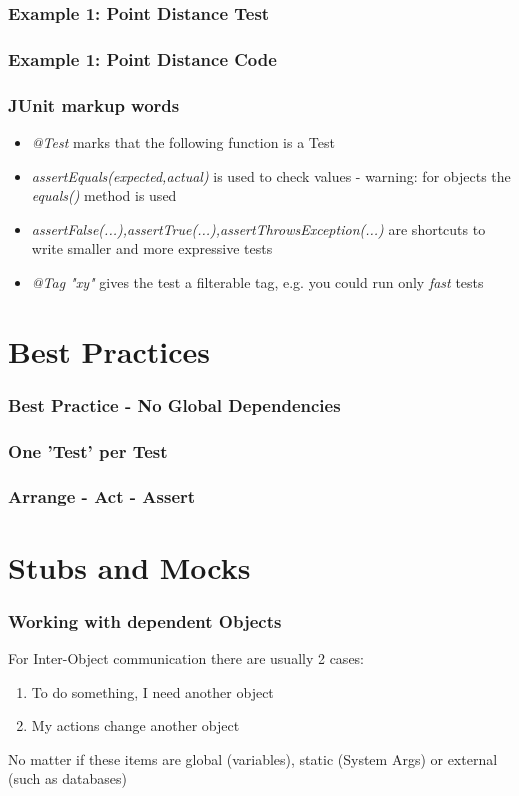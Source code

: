 \documentclass[12pt]{beamer}
\begin{document}
	\begin{frame}
		\frametitle{Example 1: Point Distance Test}
	\end{frame}
	
	\begin{frame}
		\frametitle{Example 1: Point Distance Code}
	\end{frame}
	
	\begin{frame}
		\frametitle{JUnit markup words}
		\begin{itemize}
			\item \textit{@Test} marks that the following function is a Test
			\item \textit{assertEquals(expected,actual)} is used to check values - warning: for objects the \textit{equals()} method is used 
			\item \textit{assertFalse(...),assertTrue(...),assertThrowsException(...)} are shortcuts to write smaller and more expressive tests
			\item \textit{@Tag "xy"} gives the test a filterable tag, e.g. you could run only \textit{fast} tests
		\end{itemize}
	\end{frame}

	\section{Best Practices}

	\begin{frame}
		\frametitle{Best Practice - No Global Dependencies}
	\end{frame}
	
	\begin{frame}
		\frametitle{One 'Test' per Test}
	\end{frame}
	
	\begin{frame}
		\frametitle{Arrange - Act - Assert}
	\end{frame}
	
	\section{Stubs and Mocks}
	
	\begin{frame}
		\frametitle{Working with dependent Objects}
		For Inter-Object communication there are usually 2 cases:
		\begin{enumerate}
			\item To do something, I need another object
			\item My actions change another object
		\end{enumerate}
		No matter if these items are global (variables), static (System Args) or external (such as databases) 
	\end{frame}
\end{document}

